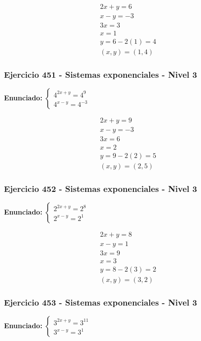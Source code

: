 \documentclass[12pt,a4paper]{article}
\begin{document}
\[
\begin{aligned}
2x+y=6\\
x-y=-3\\
3x=3\\
x=1\\
y=6-2(1)=4\\
\boxed{(x,y)=(1,4)}
\end{aligned}
\]


\subsubsection*{Ejercicio 451 - Sistemas exponenciales - Nivel 3}
\textbf{Enunciado:} \(\begin{cases} 4^{2x+y}=4^{9}\\ 4^{x-y}=4^{-3}\end{cases}\)

\[
\begin{aligned}
2x+y=9\\
x-y=-3\\
3x=6\\
x=2\\
y=9-2(2)=5\\
\boxed{(x,y)=(2,5)}
\end{aligned}
\]


\subsubsection*{Ejercicio 452 - Sistemas exponenciales - Nivel 3}
\textbf{Enunciado:} \(\begin{cases} 2^{2x+y}=2^{8}\\ 2^{x-y}=2^{1}\end{cases}\)

\[
\begin{aligned}
2x+y=8\\
x-y=1\\
3x=9\\
x=3\\
y=8-2(3)=2\\
\boxed{(x,y)=(3,2)}
\end{aligned}
\]


\subsubsection*{Ejercicio 453 - Sistemas exponenciales - Nivel 3}
\textbf{Enunciado:} \(\begin{cases} 3^{2x+y}=3^{11}\\ 3^{x-y}=3^{1}\end{cases}\)
\end{document}
